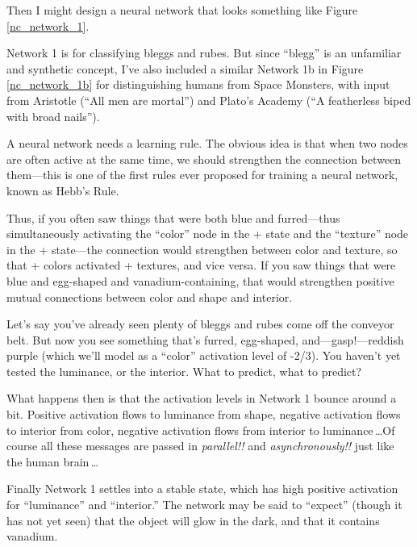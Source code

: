 {{{
 Then I might design a neural network that looks something like
Figure \ref{nc_network_1}.}


{
 Network 1 is for classifying bleggs and rubes. But since
``blegg'' is an unfamiliar and
synthetic concept, I've also included a similar Network
1b in Figure \ref{nc_network_1b} for distinguishing humans from Space Monsters, with
input from Aristotle (``All men are
mortal'') and Plato's Academy
(``A featherless biped with broad
nails'').}


{
 A neural network needs a learning rule. The obvious idea is that
when two nodes are often active at the same time, we should strengthen
the connection between them---this is one of the first rules ever
proposed for training a neural network, known as Hebb's
Rule.}

{
 Thus, if you often saw things that were both blue and
furred---thus simultaneously activating the
``color'' node in the + state and
the ``texture'' node in the +
state---the connection would strengthen between color and texture, so
that + colors activated + textures, and vice versa. If you saw things
that were blue and egg-shaped and vanadium-containing, that would
strengthen positive mutual connections between color and shape and
interior.}

{
 Let's say you've already seen
plenty of bleggs and rubes come off the conveyor belt. But now you see
something that's furred, egg-shaped,
and---gasp!---reddish purple (which we'll model as a
``color'' activation level of -2/3).
You haven't yet tested the luminance, or the interior.
What to predict, what to predict?}

{
 What happens then is that the activation levels in Network 1
bounce around a bit. Positive activation flows to luminance from shape,
negative activation flows to interior from color, negative activation
flows from interior to luminance\,\ldots Of course all these messages are
passed in \textit{parallel!!} and \textit{asynchronously!!} just like
the human brain\,\ldots}

{
 Finally Network 1 settles into a stable state, which has high
positive activation for
``luminance'' and
``interior.'' The network may be
said to ``expect'' (though it has
not yet seen) that the object will glow in the dark, and that it
contains vanadium.}

}}
